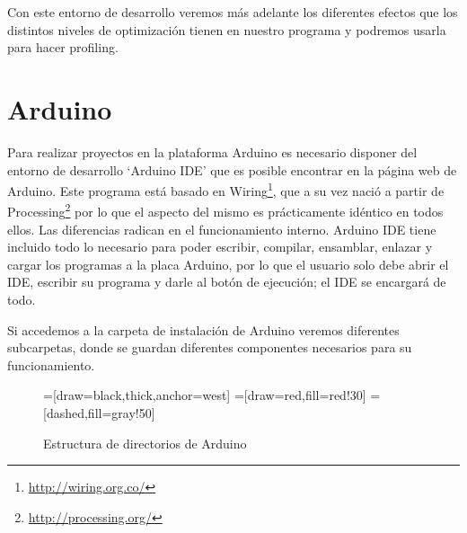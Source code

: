 Con este entorno de desarrollo veremos más adelante los diferentes efectos que los distintos niveles de optimización tienen en nuestro programa y podremos usarla para hacer profiling.

\section{Arduino}
Para realizar proyectos en la plataforma Arduino es necesario disponer del entorno de desarrollo `Arduino IDE' que es posible encontrar en la página web de Arduino. Este programa está basado en Wiring\footnote{\url{http://wiring.org.co/}}, que a su vez nació a partir de Processing\footnote{\url{http://processing.org/}} por lo que el aspecto del mismo es prácticamente idéntico en todos ellos. Las diferencias radican en el funcionamiento interno. Arduino IDE tiene incluido todo lo necesario para poder escribir, compilar, ensamblar, enlazar y cargar los programas a la placa Arduino, por lo que el usuario solo debe abrir el IDE, escribir su programa y darle al botón de ejecución; el IDE se encargará de todo.

Si accedemos a la carpeta de instalación de Arduino veremos diferentes subcarpetas, donde se guardan diferentes componentes necesarios para su funcionamiento.
\begin{figure}[H]
\begin{center}
=[draw=black,thick,anchor=west]
=[draw=red,fill=red!30]
=[dashed,fill=gray!50]
\end{center}
\caption{Estructura de directorios de Arduino}
\label{arduino_carpetas}
\end{figure}

